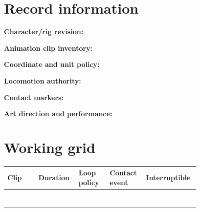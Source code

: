 \documentclass[10pt,letterpaper]{article}
\begin{document}
\makedoctitle
\makedocsummary

\section{Record information}
\noindent\textbf{Character/rig revision:}\quad\hrulefill\par\vspace{10pt}
\noindent\textbf{Animation clip inventory:}\quad\hrulefill\par\vspace{10pt}
\noindent\textbf{Coordinate and unit policy:}\quad\hrulefill\par\vspace{10pt}
\noindent\textbf{Locomotion authority:}\quad\hrulefill\par\vspace{10pt}
\noindent\textbf{Contact markers:}\quad\hrulefill\par\vspace{10pt}
\noindent\textbf{Art direction and performance:}\quad\hrulefill\par\vspace{10pt}\section{Working grid}
\begin{longtable}{|p{0.156\linewidth}|p{0.156\linewidth}|p{0.156\linewidth}|p{0.156\linewidth}|p{0.156\linewidth}|}
\hline
\textbf{Clip} & \textbf{Duration} & \textbf{Loop policy} & \textbf{Contact event} & \textbf{Interruptible}\\\hline
\endhead
\rule{0pt}{20pt} &  &  &  & \\\hline
\rule{0pt}{20pt} &  &  &  & \\\hline
\rule{0pt}{20pt} &  &  &  & \\\hline
\rule{0pt}{20pt} &  &  &  & \\\hline
\rule{0pt}{20pt} &  &  &  & \\\hline
\rule{0pt}{20pt} &  &  &  & \\\hline
\rule{0pt}{20pt} &  &  &  & \\\hline
\end{longtable}
\end{document}
